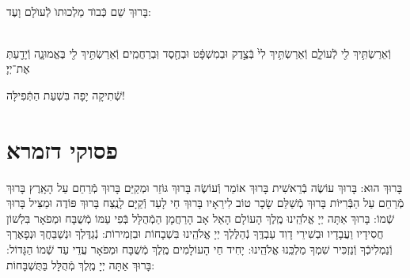 \documentclass[twoside, openany, parskip=half, 11pt]{book}
\begin{document}
\\
בָּרוּךְ שֵׁם כְּֿבוֺד מַלְכוּתוֺ לְֿעוֺלָם וָעֶד:


\\
וְֿאֵרַשְׂתִּ֥יךְ לִ֖י לְֿעוֹלָ֑ם וְֿאֵרַשְׂתִּ֥יךְ לִי֙ בְּֿצֶ֣דֶק וּבְמִשְׁפָּ֔ט וּבְחֶ֖סֶד וּֽבְרַחֲמִֽים׃ וְֿאֵרַשְׂתִּ֥יךְ לִ֖י בֶּאֱמוּנָ֑ה וְֿיָדַ֖עַתְּ אֶת־יְיָ׃


\vfill

\begin{Large}
שְֿׁתִיקָה יָפָה בִּשְׁעַת הַתְּֿפִילָּה!
\end{Large}



\section[שחרית לחול]{ פסוקי דזמרא }



בָּרוּךְ הוּא:
בָּרוּךְ עוֹשֶׂה בְֿרֵאשִׁית בָּרוּךְ אוֹמֵר וְֿעוֹשֶׂה
בָּרוּךְ גּוֹזֵר וּמְקַיֵּם בָּרוּךְ מְֿרַחֵם עַל הָאָֽרֶץ
בָּרוּךְ מְֿרַחֵם עַל הַבְּֿרִיּוֹת בָּרוּךְ מְֿשַׁלֵּם שָׂכָר טוֹב לִירֵאָיו
בָּרוּךְ חַי לָעַד וְֿקַיָּם לָנֶֽצַח בָּרוּךְ פּוֹדֶה וּמַצִּיל בָּרוּךְ שְֿׁמוֹ:
בָּרוּךְ אַתָּה יְיָ אֱלֹהֵֽינוּ מֶֽלֶךְ הָעוֹלָם הָאֵל אָב הָרַחֲמָן הַמְֿהֻלָּל בְּֿפִי עַמּוֹ מְֿשֻׁבָּח וּמְפֹאָר בִּלְשׁוֹן חֲסִידָיו וַעֲבָדָיו וּבְשִׁירֵי דָוִד עַבְדֶּֽךָ נְֿהַלֶּלְךָ יְיָ אֱלֹהֵֽינוּ בִּשְׁבָחוֹת וּבִזְמִירוֹת: נְֿגַדֶּלְךָ וּנְשַׁבֵּחֲךָ וּנְפָאֶרְךָ וְֿנַמְלִיכְֿךָ וְֿנַזְכִּיר שִׁמְךָ מַלְכֵּֽנוּ אֱלֹהֵֽינוּ:
 יָחִיד חַי הָעוֹלָמִים מֶֽלֶךְ מְֿשֻׁבָּח וּמְפֹאָר עֲדֵי עַד שְֿׁמוֹ הַגָּדוֹל: בָּרוּךְ אַתָּה יְיָ מֶֽלֶךְ מְֿהֻלָּל בַּתֻּשְׁבָּחוֹת:
\end{document}
